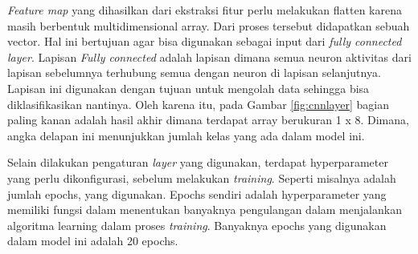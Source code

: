 \emph{Feature map} yang dihasilkan dari ekstraksi fitur perlu melakukan flatten karena masih berbentuk multidimensional array. Dari proses tersebut didapatkan sebuah vector. Hal ini bertujuan agar bisa digunakan sebagai input dari \emph{fully connected layer}. Lapisan \emph{Fully connected} adalah lapisan dimana semua neuron aktivitas dari lapisan sebelumnya terhubung semua dengan neuron di lapisan selanjutnya. Lapisan ini digunakan dengan tujuan untuk mengolah data sehingga bisa diklasifikasikan nantinya. Oleh karena itu, pada Gambar \ref{fig:cnnlayer} bagian paling kanan adalah hasil akhir dimana terdapat array berukuran 1 x 8. Dimana, angka delapan ini menunjukkan jumlah kelas yang ada dalam model ini.

Selain dilakukan pengaturan \emph{layer} yang digunakan, terdapat hyperparameter yang perlu dikonfigurasi, sebelum melakukan \emph{training}. Seperti misalnya adalah jumlah epochs, yang digunakan. Epochs sendiri adalah hyperparameter yang memiliki fungsi dalam menentukan banyaknya pengulangan dalam menjalankan algoritma learning dalam proses \emph{training}. Banyaknya epochs yang digunakan dalam model ini adalah 20 epochs. 



